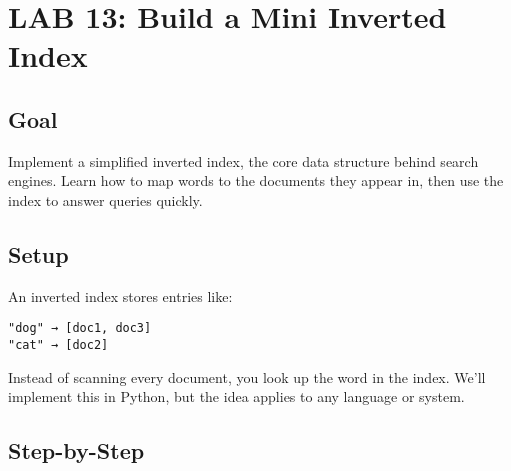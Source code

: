 \documentclass[
  letterpaper,
  DIV=11,
  numbers=noendperiod]{scrreprt}
\begin{document}
\section{LAB 13: Build a Mini Inverted
Index}\label{lab-13-build-a-mini-inverted-index}

\subsection{Goal}\label{goal-12}

Implement a simplified inverted index, the core data structure behind
search engines. Learn how to map words to the documents they appear in,
then use the index to answer queries quickly.

\subsection{Setup}\label{setup-12}

An inverted index stores entries like:

\begin{verbatim}
"dog" → [doc1, doc3]  
"cat" → [doc2]  
\end{verbatim}

Instead of scanning every document, you look up the word in the index.
We'll implement this in Python, but the idea applies to any language or
system.

\subsection{Step-by-Step}\label{step-by-step-12}
\end{document}
